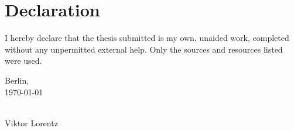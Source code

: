 \chapter*{Declaration}
\thispagestyle{empty}

I hereby declare that the thesis submitted is my own, unaided work, completed without
any unpermitted external help. Only the sources and resources listed were used.

\vspace{3cm}

\noindent{}Berlin, \\\today
\begin{minipage}[t]{8cm}
\centering \hspace{20mm} \hrulefill \\
\hspace{20mm}Viktor Lorentz
\end{minipage}